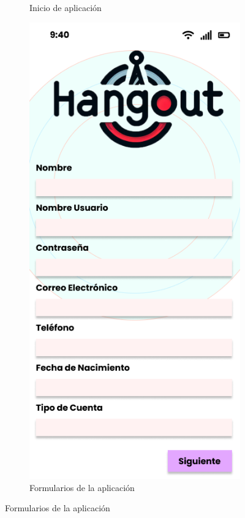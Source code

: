 \begin{figure}[H]
\begin{subfigure}{0.45\textwidth}
        \caption{Inicio de aplicación}
        \label{fig:img1}
    \end{subfigure}%
    \hfill
    \begin{subfigure}{0.45\textwidth}
        \centering
        \includegraphics[width=\linewidth]{imagenes/mockup2.png}
        \caption{Formularios de la aplicación}
        \label{fig:img2}
    \end{subfigure}
\end{figure}
\vspace*{\fill}

